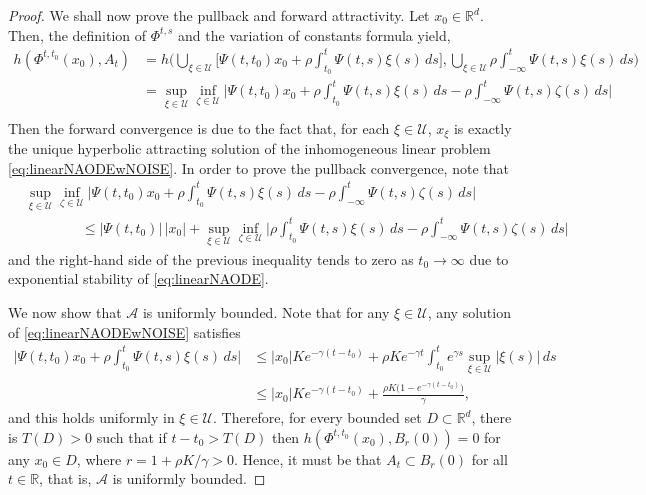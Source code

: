 \documentclass[10pt,a4paper]{amsart}
\newcommand{\A}{\mathcal{A}}
\newcommand{\R}{\mathbb{R}}
\newcommand{\U}{\mathcal{U}}
\begin{document}
\begin{proof}
    We shall now prove the pullback and forward attractivity. Let $x_0\in\R^d$. Then, the definition of $\Phi^{t,s}$ and the variation of constants formula yield,
    \[
    \begin{split}
    h(\Phi^{t,t_0}(x_0), A_t)&= h\bigg(\bigcup_{\xi\in\U}\Big[\Psi(t,t_0)x_0 +\rho\int_{t_0}^t\Psi(t,s)\xi(s)\,ds\Big], \bigcup_{\xi\in\U}\rho\int_{-\infty}^t\Psi(t,s)\xi(s)\,ds\bigg)\\
    &=\sup_{\xi\in\U}\inf_{\zeta\in\U}\bigg|\Psi(t,t_0)x_0 +\rho\int_{t_0}^t\Psi(t,s)\xi(s)\,ds-\rho\int_{-\infty}^t\Psi(t,s)\zeta(s)\,ds\bigg|\\
    \end{split}
    \]
    Then the forward convergence is due to the fact that, for each $\xi\in\U$, $x_\xi$ is exactly the unique hyperbolic attracting solution of the inhomogeneous linear problem \eqref{eq:linearNAODEwNOISE}.
    In order to prove the pullback convergence, note that 
    \[
    \begin{split}
    &\sup_{\xi\in\U}\inf_{\zeta\in\U}\bigg|\Psi(t,t_0)x_0 +\rho\int_{t_0}^t\Psi(t,s)\xi(s)\,ds-\rho\int_{-\infty}^t\Psi(t,s)\zeta(s)\,ds\bigg|\\
    &\qquad\qquad\le |\Psi(t,t_0)|\,|x_0|+\sup_{\xi\in\U}\inf_{\zeta\in\U}\bigg|\rho\int_{t_0}^t\Psi(t,s)\xi(s)\,ds-\rho\int_{-\infty}^t\Psi(t,s)\zeta(s)\,ds\bigg|
    \end{split}
    \]
    and the right-hand side of the previous inequality tends to zero as $t_0\to\infty$ due to exponential stability of \eqref{eq:linearNAODE}. 
    
    We now show that $ \A$ is uniformly bounded. Note that for any $\xi\in\U$, any solution of \eqref{eq:linearNAODEwNOISE} satisfies 
    \[
    \begin{split}
    \bigg|\Psi(t,t_0)x_0 +\rho\int_{t_0}^t\Psi(t,s)\xi(s)\,ds\bigg|
    &\le |x_0|Ke^{-\gamma(t-t_0)}+\rho Ke^{-\gamma t}\int_{t_0}^te^{\gamma s}\sup_{\xi\in\U}|\xi(s)|\, ds \\  
    &\le |x_0|Ke^{-\gamma(t-t_0)}+\frac{\rho K \big(1-e^{-\gamma(t-t_0)}\big)}{\gamma},
    \end{split}
    \]
    and this holds uniformly in $\xi\in \U$. Therefore, for every bounded set $D\subset \R^d$, there is $T(D) >0$ such that if $t-t_0>T(D)$ then $h(\Phi^{t,t_0} (x_0), B_r(0))=0$ for any $x_0\in D$, where $r=1+\rho K/ \gamma>0$. Hence, it must be that $A_t\subset B_{r}(0)$ for all $t\in\R$, that is, $\A$ is uniformly bounded. \smallskip


\end{proof}
\end{document}
